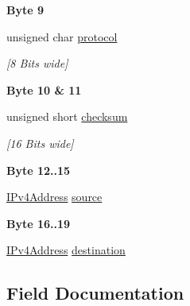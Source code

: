 \begin{Indent}\textbf{ Byte 9}\par
\begin{DoxyCompactItemize}
\item 
unsigned char \mbox{\hyperlink{structipv4_header___aadf392350a5875d2442664803a0eadc9}{protocol}}
\begin{DoxyCompactList}\small\item\em \mbox{[}8 Bits wide\mbox{]} \end{DoxyCompactList}\end{DoxyCompactItemize}
\end{Indent}
\begin{Indent}\textbf{ Byte 10 \& 11}\par
\begin{DoxyCompactItemize}
\item 
unsigned short \mbox{\hyperlink{structipv4_header___a4b964731ebafd0c435d479b631f754ff}{checksum}}
\begin{DoxyCompactList}\small\item\em \mbox{[}16 Bits wide\mbox{]} \end{DoxyCompactList}\end{DoxyCompactItemize}
\end{Indent}
\begin{Indent}\textbf{ Byte 12..15}\par
\begin{DoxyCompactItemize}
\item 
\mbox{\hyperlink{group__ipv4_gac3530474aec32033cd4709abdc7bded7}{I\+Pv4\+Address}} \mbox{\hyperlink{structipv4_header___ae5e26d61ffcb6e12414716869fc6e8e8}{source}}
\end{DoxyCompactItemize}
\end{Indent}
\begin{Indent}\textbf{ Byte 16..19}\par
\begin{DoxyCompactItemize}
\item 
\mbox{\hyperlink{group__ipv4_gac3530474aec32033cd4709abdc7bded7}{I\+Pv4\+Address}} \mbox{\hyperlink{structipv4_header___a3eb32496d9688dd666653f0093f99081}{destination}}
\end{DoxyCompactItemize}
\end{Indent}


\subsection{Field Documentation}
\mbox{\label{structipv4_header___a4b964731ebafd0c435d479b631f754ff}} 
